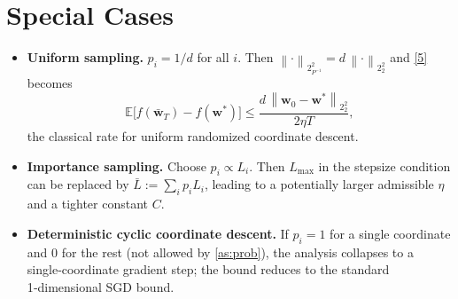 \documentclass{article}
\newcommand{\E}{\mathbb{E}}
\newcommand{\norm}[2][2]{\left\lVert #2\right\rVert_{#1}}
\begin{document}
\section*{Special Cases}
\begin{itemize}
\item \textbf{Uniform sampling.} $p_i=1/d$ for all $i$.
Then $\norm{\cdot}_{P^{-1}}^{2}=d\,\norm{\cdot}_{2}^{2}$ and \eqref{5} becomes
\[
\E\!\big[f(\bar{\mathbf{w}}_{T})-f(\mathbf{w}^{*})\big]
\le \frac{d\,\norm{\mathbf{w}_{0}-\mathbf{w}^{*}}_{2}^{2}}{2\eta T},
\]
the classical rate for uniform randomized coordinate descent.

\item \textbf{Importance sampling.} Choose $p_i\propto L_i$.
Then $L_{\max}$ in the stepsize condition can be replaced by $\bar L:=\sum_i p_i L_i$, leading to a potentially larger admissible $\eta$ and a tighter constant $C$.

\item \textbf{Deterministic cyclic coordinate descent.}
If $p_i=1$ for a single coordinate and $0$ for the rest (not allowed by \ref{as:prob}), the analysis collapses to a single‑coordinate gradient step; the bound reduces to the standard 1‑dimensional SGD bound.
\end{itemize}
\end{document}
